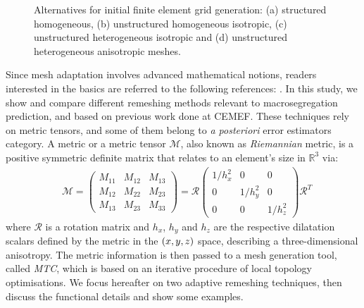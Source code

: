\begin{figure}[htbp]
\begin{subfigure}[t]{0.25\textwidth}
	\caption{}
    \label{fig:mesh_aniso_hetero_unstruct}
  \end{subfigure}
\caption{Alternatives for initial finite element grid generation: (a) structured homogeneous, (b) unstructured homogeneous isotropic,
(c) unstructured heterogeneous isotropic and (d) unstructured heterogeneous anisotropic meshes.} 
\label{fig:premeshing_options}
\end{figure}
%

Since mesh adaptation involves advanced mathematical notions, readers interested 
in the basics are referred to the following references:
\citep{coupez_grandes_1991,coupez_generation_2000,gruau_3d_2005,jannoun_space-time_2014}.
In this study, we show and compare different remeshing methods relevant to macrosegregation prediction, and based on previous work
done at CEMEF. These techniques rely on metric tensors, and some of them belong to
\emph{a posteriori} error estimators category. A metric or a metric tensor $\mathcal{M}$, 
also known as \emph{Riemannian} metric, is a positive symmetric definite matrix that relates 
to an element's size in $\mathbb{R}^3$ via:
\begin{align}
\label{eq:metric}
& \mathcal{M} = 
\begin{pmatrix}
M_{11} & M_{12} & M_{13} \\
M_{12} & M_{22} & M_{23} \\
M_{13} & M_{23} & M_{33}
\end{pmatrix}
=
\mathcal{R} 
\begin{pmatrix}
1/{h_x^2} & 0 & 0 \\
0 & 1/{h_y^2} & 0 \\
0 & 0 & 1/{h_z^2}
\end{pmatrix}
\mathcal{R}^T
\end{align}
where $\mathcal{R}$ is a rotation matrix and $h_x$, $h_y$ and $h_z$ are the respective 
dilatation scalars defined by the metric in the $\left( x,y,z \right)$ space, describing
a three-dimensional anisotropy.
The metric information is then passed to a mesh generation tool, called \emph{MTC},
which is based on an iterative procedure of local topology optimisations. We focus hereafter
on two adaptive remeshing techniques, then discuss the functional details and show some examples.

